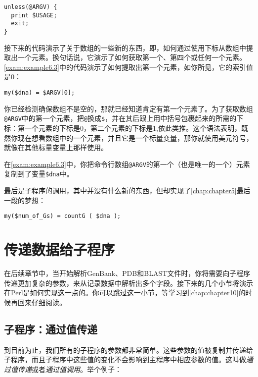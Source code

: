\begin{lstlisting}
unless(@ARGV) {
  print $USAGE;
  exit;
}
\end{lstlisting}

接下来的代码演示了关于数组的一些新的东西，即，如何通过使用下标从数组中提取出一个元素。换句话说，它演示了如何获取第一个、第四个或任何一个元素。\autoref{exam:example6.3}中的代码演示了如何提取出第一个元素，如你所见，它的索引值是0：

\begin{lstlisting}
my($dna) = $ARGV[0];
\end{lstlisting}

你已经检测确保数组不是空的，那就已经知道肯定有第一个元素了。为了获取数组\verb|@ARGV|中的第一个元素，把\verb|@|换成\verb|$|，并在其后跟上用中括号包裹起来的所需的下标：第一个元素的下标是0，第二个元素的下标是1,依此类推。这个语法表明，既然你现在想看数组中的一个元素，并且它是一个标量变量，那你就使用美元符号，就像在其他标量变量上那样使用。

在\autoref{exam:example6.3}中，你把命令行数组\verb|@ARGV|的第一个（也是唯一的一个）元素复制到了变量\verb|$dna|中。

最后是子程序的调用，其中并没有什么新的东西，但却实现了\autoref{chap:chapter5}最后一段的梦想：

\begin{lstlisting}
my($num_of_Gs) = countG ( $dna );
\end{lstlisting}

\section{传递数据给子程序}
在后续章节中，当开始解析GenBank、PDB和BLAST文件时，你将需要向子程序传递更加复杂的参数，来从记录数据中解析出多个字段。接下来的几个小节将演示在Perl是如何实现这一点的。你可以跳过这一小节，等学习到\autoref{chap:chapter10}的时候再回来仔细阅读。

\subsection{子程序：通过值传递}
\label{sect:section6.4.1}
到目前为止，我们所有的子程序的参数都非常简单。这些参数的值被复制并传递给子程序，而且子程序中这些值的变化不会影响到主程序中相应参数的值。这叫做\textit{通过值传递}或者\textit{通过值调用}。举个例子：

